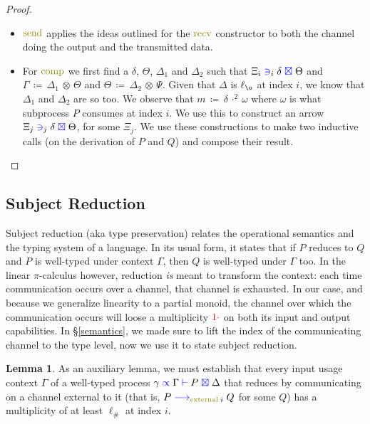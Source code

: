 \documentclass[a4paper,UKenglish,cleveref, autoref, thm-restate,authorcolumns]{lipics-v2019}
\theoremstyle{definition}
\newtheorem{nilemma}[theorem]{Lemma}
\newcommand{\picalc}{$\pi$-calculus}
\newcommand{\type}[1]{\textcolor{blue}{\operatorname{#1}}}
\newcommand{\constr}[1]{\textcolor{olive}{\operatorname{#1}}}
\newcommand{\field}[1]{\textcolor{red}{\operatorname{#1}}}
\newcommand{\opsquared}[3]{#1 \, \coloneqq \, #2 \, \cdot^2 \, #3}
\newcommand{\opctx}[3]{#1 \, \coloneqq \, #2 \, \otimes \, #3}
\newcommand{\one}{\field{1\cdot}}
\newcommand{\lz}{\ell_{\o}}
\newcommand{\lio}{\ell_{\#}}
\newcommand{\reduce}[1]{\; \type{\longrightarrow}_{#1} \;}
\newcommand{\types}[4]{#1 \; \type{\propto} \; #2 \; \type{\vdash} \; #3 \; \type{\boxtimes} \; #4}
\newcommand{\containsusage}[4]{#1 \; \type{\ni}_{#2} \; #3 \; \type{\boxtimes} \; #4}
\begin{document}
\begin{proof}
\begin{itemize}
    \item
      $\constr{send}$ applies the ideas outlined for the $\constr{recv}$ constructor to both the channel doing the output and the transmitted data.

    \item
      For $\constr{comp}$ we first find a $\delta$, $\Theta$, $\Delta_1$ and $\Delta_2$ such that $\containsusage{\Xi_i}{i}{\delta}{\Theta}$ and $\opctx{\Gamma}{\Delta_1}{\Theta}$ and $\opctx{\Theta}{\Delta_2}{\Psi}$.
      Given that $\Delta$ is $\lz$ at index $i$, we know that $\Delta_1$ and $\Delta_2$ are so too.
      We observe that $\opsquared{m}{\delta}{\omega}$ where $\omega$ is what subprocess $P$ consumes at index $i$.
      We use this to construct an arrow $\containsusage{\Xi_j}{j}{\delta}{\Theta}$, for some $\Xi_j$.
      We use these constructions to make two inductive calls (on the derivation of $P$ and $Q$) and compose their result.
  \end{itemize}  
\end{proof}


\subsection{Subject Reduction}
\label{subject-reduction}

Subject reduction (aka type preservation) relates the operational semantics and the typing system of a language.
In its usual form, it states that if $P$ reduces to $Q$ and $P$ is well-typed under context $\Gamma$, then $Q$ is well-typed under $\Gamma$ too.
In the linear \picalc{} however, reduction \emph{is} meant to transform the context: each time communication occurs over a channel, that channel is exhausted.
In our case, and because we generalize linearity to a partial monoid, the channel over which the communication occurs will loose a multiplicity $\one$ on both its input and output capabilities.
In \S \ref{semantics}, we made sure to lift the index of the communicating channel to the type level, now we use it to state subject reduction.

\begin{nilemma}
  \label{lm:comm-capable}
  As an auxiliary lemma, we must establish that every input usage context $\Gamma$ of a well-typed process $\types{\gamma}{\Gamma}{P}{\Delta}$ that reduces by communicating on a channel external to it (that is, $P \reduce{\constr{external} \; i} Q$ for some $Q$) has a multiplicity of at least $\lio$ at index $i$.
\end{nilemma}
\end{document}
